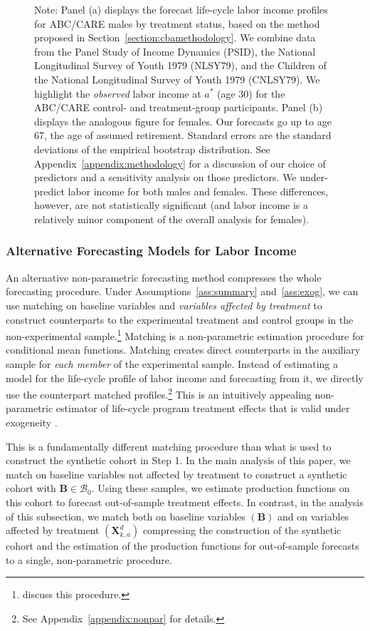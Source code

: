 \begin{figure}
Note: Panel (a) displays the forecast life-cycle labor income profiles for ABC/CARE males by treatment status, based on the method proposed in Section~\ref{section:cbamethodology}. We combine data from the Panel Study of Income Dynamics (PSID), the National Longitudinal Survey of Youth 1979 (NLSY79), and the Children of the National Longitudinal Survey of Youth 1979 (CNLSY79). We highlight the \textit{observed} labor income at $a^*$ (age 30) for the ABC/CARE control- and treatment-group participants. Panel (b) displays the analogous figure for females. Our forecasts go up to age 67, the age of assumed retirement. Standard errors are the standard deviations of the empirical bootstrap distribution. See  Appendix~\ref{appendix:methodology} for a discussion of our choice of predictors and a sensitivity analysis on those predictors. We under-predict labor income for both males and females. These differences, however, are not statistically significant (and labor income is a relatively minor component of the overall analysis for females).
\end{figure}

\subsubsection{Alternative Forecasting Models for Labor Income} \label{section:sens}

\noindent An alternative non-parametric forecasting method compresses the whole forecasting procedure. Under Assumptions~\ref{ass:summary} and~\ref{ass:exog}, we can use matching on baseline variables and \emph{variables affected by treatment} to construct counterparts to the experimental treatment and control groups in the non-experimental sample.\footnote{\citet{Heckman_Ichimura_etal_1998_Econometrica} discuss this procedure.} Matching is a non-parametric estimation procedure for conditional mean functions. Matching creates direct counterparts in the auxiliary sample for \textit{each member} of the experimental sample. Instead of estimating a model for the life-cycle profile of labor income and forecasting from it, we directly use the counterpart matched profiles.\footnote{See Appendix~\ref{appendix:nonpar} for details.} This is an intuitively appealing non-parametric estimator of life-cycle program treatment effects that is valid under exogeneity \citep{Heckman_Navarro_2004_REStat}.

This is a fundamentally different matching procedure than what is used to construct the synthetic cohort in Step 1. In the main analysis of this paper, we match on baseline variables  not affected by treatment to construct a synthetic cohort with $\bm{B} \in \mathcal{B}_0$. Using these samples, we estimate production functions on this cohort to forecast out-of-sample treatment effects. In contrast, in the analysis of this subsection, we match both on baseline variables $\left( \bm{B} \right)$ and on variables affected by treatment $\left( \bm{X}_{k,a}^d \right)$ compressing the construction of the synthetic cohort and the estimation of the production functions for out-of-sample forecasts to a single, non-parametric procedure.

